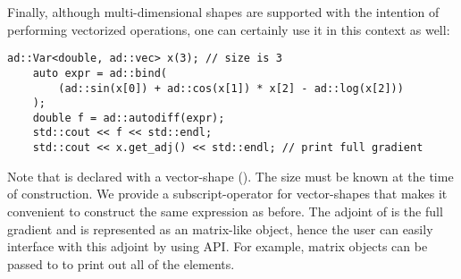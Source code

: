 Finally, although multi-dimensional shapes are supported with the intention of
performing vectorized operations, one can certainly use it in this context as well:
\begin{lstlisting}[style=customcpp]
    ad::Var<double, ad::vec> x(3); // size is 3
    auto expr = ad::bind(
        (ad::sin(x[0]) + ad::cos(x[1]) * x[2] - ad::log(x[2]))
    );
    double f = ad::autodiff(expr);
    std::cout << f << std::endl;
    std::cout << x.get_adj() << std::endl; // print full gradient
\end{lstlisting}
Note that  is declared with a vector-shape ().
The size must be known at the time of construction.
We provide a subscript-operator for vector-shapes
that makes it convenient to construct the same expression as before.
The adjoint of  is the full gradient and 
is represented as an  matrix-like object,
hence the user can easily interface with this adjoint by using  API.\@
For example,  matrix objects can be passed to 
to print out all of the elements.
